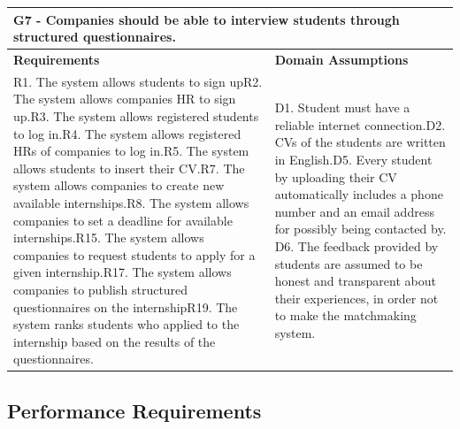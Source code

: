 \documentclass{article}
\begin{document}
\begin{table}[H]
    \centering
    \begin{tabular}{|p{}|p{}|}
        \hline
        \multicolumn{2}{|p{10cm}|}{\textbf{G7} - Companies should be able to interview students through structured questionnaires.} \\
        \hline
        \textbf{Requirements} & \textbf{Domain Assumptions} \\
        \hline
        R1. The system allows students to sign up\newline R2. The system allows companies HR to sign up.\newline R3. The system allows registered students to log in.\newline R4. The system allows registered HRs of companies to log in.\newline R5. The system allows students to insert their CV.\newline R7. The system allows companies to create new available internships.\newline R8. The system allows companies to set a deadline for available internships.\newline  R15. The system allows companies to request students to apply for a given
internship.\newline R17. The system allows companies to publish structured questionnaires on
the internship\newline R19. The system ranks students who applied to the internship based on the
results of the questionnaires.\newline & D1. Student must have a reliable internet connection.\newline D2. CVs of the students are written in English.\newline D5. Every student by uploading their CV automatically includes a phone number and an email address for possibly being contacted by. \newline D6. The feedback provided by students are assumed to be honest and transparent about their experiences, in order not to make the matchmaking system. \newline
\\
        \hline
    \end{tabular}
\end{table}

\newpage

\subsection{Performance Requirements}
\end{document}
